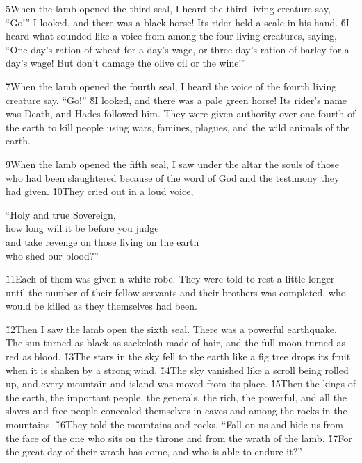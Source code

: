 \v{5}When the lamb opened the third seal, I heard the third living creature say, ``Go!'' I looked, and there was a black horse! Its rider held a scale in his hand. \v{6}I heard what sounded like a voice from among the four living creatures, saying, ``One day's ration of wheat for a day's wage, or three day's ration of barley for a day's wage! But don't damage the olive oil or the wine!''

\v{7}When the lamb opened the fourth seal, I heard the voice of the fourth living creature say, ``Go!'' \v{8}I looked, and there was a pale green horse! Its rider's name was Death, and Hades followed him. They were given authority over one-fourth of the earth to kill people using wars, famines, plagues, and the wild animals of the earth.

\v{9}When the lamb opened the fifth seal, I saw under the altar the souls of those who had been slaughtered because of the word of God and the testimony they had given. \v{10}They cried out in a loud voice,

\begin{poetry}
\poeml ``Holy and true Sovereign, \\
\poemll    how long will it be before you judge \\
\poeml and take revenge on those living on the earth \\
\poemll    who shed our blood?''
\end{poetry}

\v{11}Each of them was given a white robe. They were told to rest a little longer until the number of their fellow servants and their brothers was completed, who would be killed as they themselves had been.

\v{12}Then I saw the lamb open the sixth seal. There was a powerful earthquake. The sun turned as black as sackcloth made of hair, and the full moon turned as red as blood. \v{13}The stars in the sky fell to the earth like a fig tree drops its fruit when it is shaken by a strong wind. \v{14}The sky vanished like a scroll being rolled up, and every mountain and island was moved from its place. \v{15}Then the kings of the earth, the important people, the generals, the rich, the powerful, and all the slaves and free people concealed themselves in caves and among the rocks in the mountains. \v{16}They told the mountains and rocks, ``Fall on us and hide us from the face of the one who sits on the throne and from the wrath of the lamb. \v{17}For the great day of their wrath has come, and who is able to endure it?''

